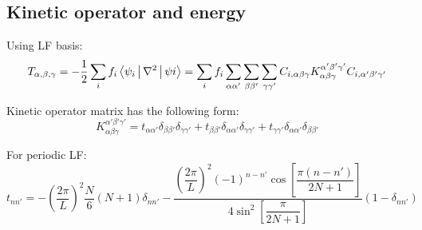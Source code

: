 \subsection{Kinetic operator and energy}

Using LF basis:
\begin{equation}
T_{\alpha,\beta,\gamma} = -\frac{1}{2} \sum_{i} f_{i}
\Braket{ \psi_{i} | \nabla^2 | \psi{i} } =
\sum_{i} f_{i} \sum_{\alpha\alpha'} \sum_{\beta\beta'} \sum_{\gamma\gamma'}
C_{i,\alpha\beta\gamma} K_{\alpha\beta\gamma}^{\alpha'\beta'\gamma'}
C_{i,\alpha'\beta'\gamma'}
\end{equation}

Kinetic operator matrix has the following form:
\begin{equation}
K_{\alpha\beta\gamma}^{\alpha'\beta'\gamma'} =
t_{\alpha\alpha'}\delta_{\beta\beta'}\delta_{\gamma\gamma'} +
t_{\beta\beta'}\delta_{\alpha\alpha'}\delta_{\gamma\gamma'} +
t_{\gamma\gamma'}\delta_{\alpha\alpha'}\delta_{\beta\beta'}
\end{equation}

For periodic LF:
\begin{equation}
t_{nn'} = -\left( \frac{2\pi}{L} \right)^2 \frac{N}{6} \left( N + 1 \right) \delta_{nn'} -
\dfrac{ \left(\dfrac{2\pi}{L}\right)^2 (-1)^{n-n'}\cos\left[\dfrac{\pi(n-n')}{2N+1}\right]}
{4\sin^2\left[\dfrac{\pi}{2N+1}\right]}
(1-\delta_{nn'})
\end{equation}

